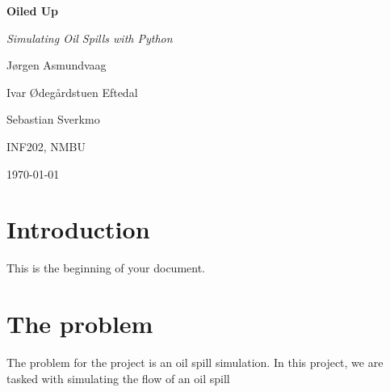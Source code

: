 \documentclass[a4paper,12pt]{article}
\begin{document}
\begin{titlepage}
    \centering
    \vspace*{2cm} %
    {\Huge\bfseries Oiled Up \par} %
    \vspace{0.5cm}
    {\Large\itshape Simulating Oil Spills with Python \par} %
    \vspace{2cm}
    {\Large Jørgen Asmundvaag \par} %
    {\Large Ivar Ødegårdstuen Eftedal \par} %
    {\Large Sebastian Sverkmo \par} 
    \vspace{1cm}
    {\large INF202, NMBU \par} %
    \vfill
    {\large \today} %
    \vspace*{1cm}
\end{titlepage}

\section*{Introduction}
This is the beginning of your document.

\section*{The problem}
The problem for the project is an oil spill simulation. In this project, we are tasked with simulating the flow of an oil spill 
\end{document}
